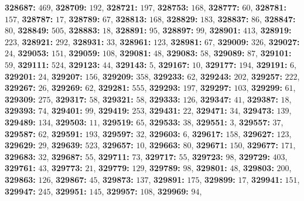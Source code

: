 \textsf{\bfseries 328687:} $469$, \textsf{\bfseries 328709:} $192$, \textsf{\bfseries 328721:} $197$, \textsf{\bfseries 328753:} $168$, \textsf{\bfseries 328777:} $60$, \textsf{\bfseries 328781:} $157$, \textsf{\bfseries 328787:} $17$, \textsf{\bfseries 328789:} $67$, \textsf{\bfseries 328813:} $168$, \textsf{\bfseries 328829:} $183$, \textsf{\bfseries 328837:} $86$, \textsf{\bfseries 328847:} $80$, \textsf{\bfseries 328849:} $505$, \textsf{\bfseries 328883:} $18$, \textsf{\bfseries 328891:} $95$, \textsf{\bfseries 328897:} $99$, \textsf{\bfseries 328901:} $413$, \textsf{\bfseries 328919:} $223$, \textsf{\bfseries 328921:} $292$, \textsf{\bfseries 328931:} $33$, \textsf{\bfseries 328961:} $123$, \textsf{\bfseries 328981:} $67$, \textsf{\bfseries 329009:} $326$, \textsf{\bfseries 329027:} $24$, \textsf{\bfseries 329053:} $151$, \textsf{\bfseries 329059:} $108$, \textsf{\bfseries 329081:} $48$, \textsf{\bfseries 329083:} $58$, \textsf{\bfseries 329089:} $87$, \textsf{\bfseries 329101:} $59$, \textsf{\bfseries 329111:} $524$, \textsf{\bfseries 329123:} $44$, \textsf{\bfseries 329143:} $5$, \textsf{\bfseries 329167:} $10$, \textsf{\bfseries 329177:} $194$, \textsf{\bfseries 329191:} $6$, \textsf{\bfseries 329201:} $24$, \textsf{\bfseries 329207:} $156$, \textsf{\bfseries 329209:} $358$, \textsf{\bfseries 329233:} $62$, \textsf{\bfseries 329243:} $202$, \textsf{\bfseries 329257:} $222$, \textsf{\bfseries 329267:} $26$, \textsf{\bfseries 329269:} $62$, \textsf{\bfseries 329281:} $555$, \textsf{\bfseries 329293:} $197$, \textsf{\bfseries 329297:} $103$, \textsf{\bfseries 329299:} $61$, \textsf{\bfseries 329309:} $275$, \textsf{\bfseries 329317:} $58$, \textsf{\bfseries 329321:} $58$, \textsf{\bfseries 329333:} $126$, \textsf{\bfseries 329347:} $41$, \textsf{\bfseries 329387:} $18$, \textsf{\bfseries 329393:} $74$, \textsf{\bfseries 329401:} $99$, \textsf{\bfseries 329419:} $253$, \textsf{\bfseries 329431:} $22$, \textsf{\bfseries 329471:} $34$, \textsf{\bfseries 329473:} $139$, \textsf{\bfseries 329489:} $134$, \textsf{\bfseries 329503:} $11$, \textsf{\bfseries 329519:} $65$, \textsf{\bfseries 329533:} $38$, \textsf{\bfseries 329551:} $3$, \textsf{\bfseries 329557:} $37$, \textsf{\bfseries 329587:} $62$, \textsf{\bfseries 329591:} $193$, \textsf{\bfseries 329597:} $32$, \textsf{\bfseries 329603:} $6$, \textsf{\bfseries 329617:} $158$, \textsf{\bfseries 329627:} $123$, \textsf{\bfseries 329629:} $29$, \textsf{\bfseries 329639:} $523$, \textsf{\bfseries 329657:} $10$, \textsf{\bfseries 329663:} $80$, \textsf{\bfseries 329671:} $150$, \textsf{\bfseries 329677:} $171$, \textsf{\bfseries 329683:} $32$, \textsf{\bfseries 329687:} $55$, \textsf{\bfseries 329711:} $73$, \textsf{\bfseries 329717:} $55$, \textsf{\bfseries 329723:} $98$, \textsf{\bfseries 329729:} $403$, \textsf{\bfseries 329761:} $43$, \textsf{\bfseries 329773:} $21$, \textsf{\bfseries 329779:} $129$, \textsf{\bfseries 329789:} $98$, \textsf{\bfseries 329801:} $48$, \textsf{\bfseries 329803:} $200$, \textsf{\bfseries 329863:} $126$, \textsf{\bfseries 329867:} $45$, \textsf{\bfseries 329873:} $137$, \textsf{\bfseries 329891:} $175$, \textsf{\bfseries 329899:} $17$, \textsf{\bfseries 329941:} $151$, \textsf{\bfseries 329947:} $245$, \textsf{\bfseries 329951:} $145$, \textsf{\bfseries 329957:} $108$, \textsf{\bfseries 329969:} $94$, 
